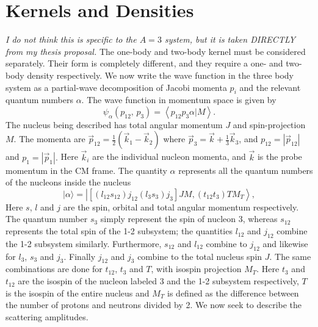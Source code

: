 \documentclass[a4paper,11pt]{article}
\newcommand{\bkt}[2]{\left \langle #1 |#2 \right \rangle}
\newcommand\bv[1]{\vec{#1}}
\newcommand{\ques}[1]{\color{red}\textit{ #1 }\color{black}}
\begin{document}
\section{Kernels and Densities}
\ques{I do not think this is specific to the $A=3$ system, but it is taken DIRECTLY from my thesis proposal.}
The one-body and two-body kernel must be considered separately.
Their form is completely different, and they require a one- and two-body density respectively.
We now write the wave function in the three body system as a
partial-wave decomposition of Jacobi momenta $p_i$ and the relevant
quantum numbers $\alpha$. The wave function in momentum space is given by
\begin{equation}
  \psi_\alpha (p_{12},\, p_3 ) = \bkt{p_{12} p_3 \alpha}{M}.
\end{equation}
The nucleus being described has total angular momentum $J$ and
spin-projection $M$. The momenta are $\bv{p}_{12}= \frac{1}{2}
\left(\bv{k}_1 - \bv{k}_2\right)$ where $ \bv{p}_3 = \bv{k}+
\frac{1}{3} \bv{k}_3 $, and $p_{12} = |\bv{p}_{12}|$ and  $p_{1} =
|\bv{p}_{1}|.$ Here $\bv{k}_i$ are the individual nucleon momenta,
and $\bv{k}$ is the probe momentum in the CM frame. The quantity
$\alpha$ represents all the quantum numbers of the nucleons inside
the nucleus~\cite{hammer2020}
\begin{equation}
  |\alpha\rangle=\left|\left[\left(l_{12} s_{12}\right)
  j_{12}\left(l_{3} s_{3}\right) j_{3}\right] J M,\left(t_{12}
  t_{3}\right) T M_{T}\right\rangle,
\end{equation}
Here $s$, $l$ and $j$ are the spin, orbital and total angular
momentum respectively. The quantum number $s_3$ simply represent the
spin of nucleon 3, whereas $s_{12}$ represents the total spin of the
1-2 subsystem; the quantities $l_{12}$ and $j_{12}$ combine the 1-2
subsystem similarly. Furthermore, $s_{12}$ and $l_{12}$ combine to
$j_{12}$ and likewise for $l_3$, $s_3$ and $j_3$. Finally $j_{12}$
and $j_3$ combine to the total nucleus spin $J$.
The same combinations are done for $t_{12}$, $t_3$ and $T$, with
isospin projection $M_T$. Here $t_3$ and $t_{12}$ are the isospin of
the nucleon labeled 3 and the 1-2 subsystem respectively, $T$ is the
isospin of the entire nucleus and $M_T$ is defined as the difference between the number of protons and neutrons divided by 2.
We now seek to describe the scattering amplitudes.
\end{document}
